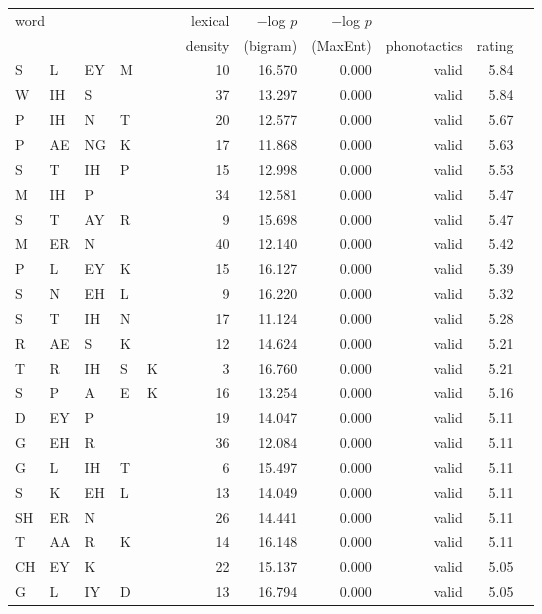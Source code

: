 \begin{longtable}{l@{ } l@{ } l@{ } l@{ } l@{ } l r r r r r r} 
\toprule
\multicolumn{6}{l}{\multirow{2}{*}{word}} & lexical & $-$log $p$ & $-$log $p$ \\
&&&&&& density & (bigram) & (MaxEnt) & phonotactics & rating \\
\midrule
S & L & EY & M &   &   & 10 & 16.570 & 0.000 & valid & 5.84 \\
W & IH & S &   &   &   & 37 & 13.297 & 0.000 & valid & 5.84 \\
P & IH & N & T &   &   & 20 & 12.577 & 0.000 & valid & 5.67 \\
P & AE & NG & K &   &   & 17 & 11.868 & 0.000 & valid & 5.63 \\
S & T & IH & P &   &   & 15 & 12.998 & 0.000 & valid & 5.53 \\
M & IH & P &   &   &   & 34 & 12.581 & 0.000 & valid & 5.47 \\
S & T & AY & R &   &   & 9 & 15.698 & 0.000 & valid & 5.47 \\
M & ER & N &   &   &   & 40 & 12.140 & 0.000 & valid & 5.42 \\
P & L & EY & K &   &   & 15 & 16.127 & 0.000 & valid & 5.39 \\
S & N & EH & L &   &   & 9 & 16.220 & 0.000 & valid & 5.32 \\
S & T & IH & N &   &   & 17 & 11.124 & 0.000 & valid & 5.28 \\
R & AE & S & K &   &   & 12 & 14.624 & 0.000 & valid & 5.21 \\
T & R & IH & S & K &   & 3 & 16.760 & 0.000 & valid & 5.21 \\
S & P & A & E & K &   & 16 & 13.254 & 0.000 & valid & 5.16 \\
D & EY & P &   &   &   & 19 & 14.047 & 0.000 & valid & 5.11 \\
G & EH & R &   &   &   & 36 & 12.084 & 0.000 & valid & 5.11 \\
G & L & IH & T &   &   & 6 & 15.497 & 0.000 & valid & 5.11 \\
S & K & EH & L &   &   & 13 & 14.049 & 0.000 & valid & 5.11 \\
SH & ER & N &   &   &   & 26 & 14.441 & 0.000 & valid & 5.11 \\
T & AA & R & K &   &   & 14 & 16.148 & 0.000 & valid & 5.11 \\
CH & EY & K &   &   &   & 22 & 15.137 & 0.000 & valid & 5.05 \\
G & L & IY & D &   &   & 13 & 16.794 & 0.000 & valid & 5.05 \\

\end{longtable}

